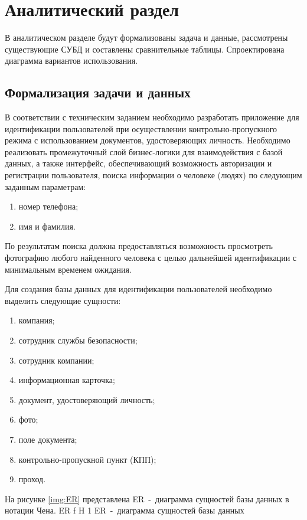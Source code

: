 \chapter{Аналитический раздел}

В аналитическом разделе будут формализованы задача и данные, рассмотрены существующие СУБД и составлены сравнительные таблицы. Спроектирована диаграмма вариантов использования.

\section{Формализация задачи и данных}

В соответствии с техническим заданием необходимо разработать приложение для идентификации пользователей при осуществлении контрольно-пропускного режима с использованием документов, удостоверяющих личность.
Необходимо реализовать промежуточный слой бизнес-логики для взаимодействия с базой данных, а также интерфейс, обеспечивающий возможность авторизации и регистрации пользователя, поиска информации о человеке (людях) по следующим заданным параметрам:
\begin{enumerate}
	\item номер телефона;
	\item имя и фамилия.
\end{enumerate}
По результатам поиска должна предоставляться возможность просмотреть фотографию любого найденного человека с целью дальнейшей идентификации с минимальным временем ожидания.

Для создания базы данных для идентификации пользователей необходимо выделить следующие сущности:
\begin{enumerate}
	\item компания;
	\item сотрудник службы безопасности;
	\item сотрудник компании;
	\item информационная карточка;
	\item документ, удостоверяющий личность;
	\item фото;
	\item поле документа;
	\item контрольно-пропускной пункт (КПП);
	\item проход.
\end{enumerate}

На рисунке \ref{img:ER} представлена ER~-~диаграмма сущностей базы данных в нотации Чена.
	{ER}
	{f}
	{H}
	{1\textwidth}
	{ER~-~диаграмма сущностей базы данных}

